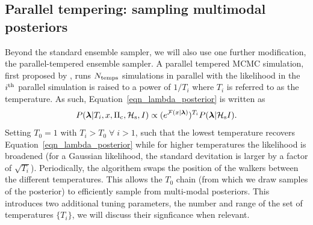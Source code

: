 \documentclass[aps, prd, twocolumn, superscriptaddress, floatfix, showpacs, nofootinbib, longbibliography]{revtex4-1}
\begin{document}
\subsection{Parallel tempering: sampling multimodal posteriors}
Beyond the standard ensemble sampler, we will also use one further
modification, the parallel-tempered ensemble sampler. A parallel
tempered MCMC simulation, first proposed by \citet{swendsen1986}, runs
$N_{\rm temps}$ simulations in parallel with the likelihood in the $i^{\rm th}$
parallel simulation is raised to a power of $1/T_{i}$ where $T_i$ is referred
to as the temperature. As such, Equation~\eqref{eqn_lambda_posterior} is
written as
\begin{equation}
P(\boldsymbol{\mathbf{\lambda}} | T_i, x, \Pi_{\rm c}, \mathcal{H}_{\rm s}, I)
\propto (e^{{\mathcal{F}}(x| \boldsymbol{\mathbf{\lambda}})})^{T_i} P(\boldsymbol{\mathbf{\lambda}}| \mathcal{H}_{\rm s} I).
\end{equation}
Setting $T_0=1$ with $T_i > T_0 \; \forall \; i > 1$, such that the lowest
temperature recovers Equation~\eqref{eqn_lambda_posterior} while for higher
temperatures the likelihood is broadened (for a Gaussian likelihood, the
standard devitation is larger by a factor of $\sqrt{T_i}$). Periodically, the
algorithem swaps the position of the walkers between the different
temperatures. This allows the $T_0$ chain (from which we draw samples of the
posterior) to efficiently sample from multi-modal posteriors. This introduces
two additional tuning parameters, the number and range of the set of
temperatures $\{T_i\}$, we will discuss their signficance when relevant.
\end{document}
